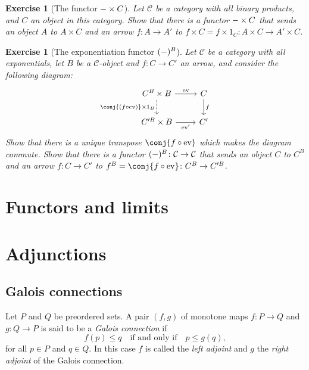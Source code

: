\documentclass[article, a4paper, 11pt, oneside]{memoir}
\numberwithin{equation}{chapter}
\newcommand{\cat}[1]{\mathcal{#1}}
\newcommand{\catC}{\cat{C}}
\theoremstyle{myexample}
\theoremstyle{myexamplebreak}
\newtheorem{exercisebreak}[theorem]{Exercise}
\begin{document}
\begin{exercisebreak}[The functor $- \times C$]
    Let $\catC$ be a category with all binary products, and $C$ an object in this category. Show that there is a functor $- \times C$ that sends an object $A$ to $A \times C$ and an arrow $f \colon A \to A'$ to $f \times C = f \times 1_C \colon A \times C \to A' \times C$.
\end{exercisebreak}


\begin{exercisebreak}[The exponentiation functor $(-)^B$]
    Let $\catC$ be a category with all exponentials, let $B$ be a $\catC$-object and $f \colon C \to C'$ an arrow, and consider the following diagram:
    \begin{equation*}
        \begin{tikzcd}
            C^B \times B
                \ar[r, "\eval"]
                \ar[d, "\conj{(f \circ \eval)} \times 1_B", dashed, swap]
            & C
                \ar[d, "f"]
            \\
            C'^B \times B
                \ar[r, "\eval'", swap]
            & C'
        \end{tikzcd}
    \end{equation*}
    Show that there is a unique transpose $\conj{f \circ \eval}$ which makes the diagram commute. Show that there is a functor $(\blank)^B \colon \catC \to \catC$ that sends an object $C$ to $C^B$ and an arrow $f \colon C \to C'$ to $f^B = \conj{f \circ \eval} \colon C^B \to C'^B$.
\end{exercisebreak}



\chapter{Functors and limits}


\chapter{Adjunctions}

\section{Galois connections}

\begin{definition}
    Let $P$ and $Q$ be preordered sets. A pair $(f,g)$ of monotone maps $f \colon P \to Q$ and $g \colon Q \to P$ is said to be a \emph{Galois connection} if
    \begin{equation*}
        f(p) \leq q
        \quad \text{if and only if} \quad
        p \leq g(q),
    \end{equation*}
    for all $p \in P$ and $q \in Q$. In this case $f$ is called the \emph{left adjoint} and $g$ the \emph{right adjoint} of the Galois connection.
\end{definition}
\end{document}
